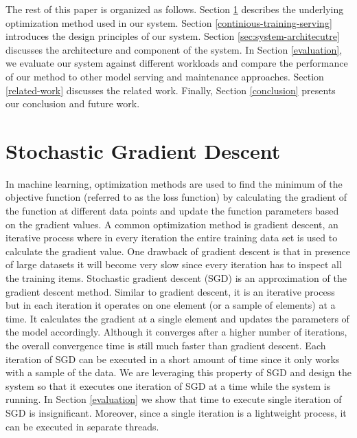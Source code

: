 \documentclass{vldb}
\begin{document}
The rest of this paper is organized as follows. 
Section \ref{sgd} describes the underlying optimization method used in our system. 
Section \ref{continious-training-serving} introduces the design principles of our system. 
Section \ref{sec:system-architecutre} discusses the architecture and component of the system.
In Section \ref{evaluation}, we evaluate our system against different workloads and compare the performance of our method to other model serving and maintenance approaches. 
Section \ref {related-work} discusses the related work.
Finally, Section \ref{conclusion} presents our conclusion and future work.

\section{Stochastic Gradient Descent} \label{sgd}

In machine learning, optimization methods are used to find the minimum of the objective function (referred to as the loss function) by calculating the gradient of the function at different data points and update the function parameters based on the gradient values.
A common optimization method is gradient descent, an iterative process where in every iteration the entire training data set is used to calculate the gradient value.
One drawback of gradient descent is that in presence of large datasets it will become very slow since every iteration has to inspect all the training items.
Stochastic gradient descent (SGD) is an approximation of the gradient descent method. 
Similar to gradient descent, it is an iterative process but in each iteration it operates on one element (or a sample of elements) at a time. 
It calculates the gradient at a single element and updates the parameters of the model accordingly. 
Although it converges after a higher number of iterations, the overall convergence time is still much faster than gradient descent. 
Each iteration of SGD can be executed in a short amount of time since it only works with a sample of the data.
We are leveraging this property of SGD and design the system so that it executes one iteration of SGD at a time while the system is running.
In Section \ref{evaluation} we show that time to execute single iteration of SGD is insignificant.
Moreover, since a single iteration is a lightweight process, it can be executed in separate threads.
\end{document}
